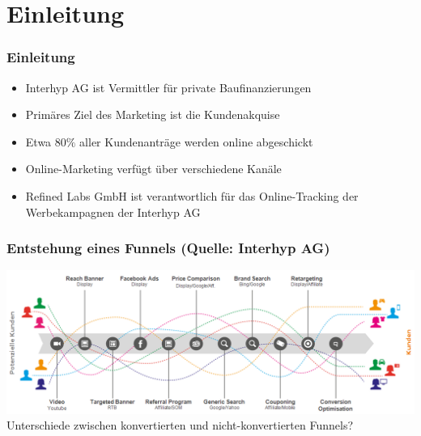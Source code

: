 \section{Einleitung} 

\begin{frame}\frametitle{Einleitung} 
	\begin{itemize}
		\item Interhyp AG ist Vermittler für private Baufinanzierungen
		\item Primäres Ziel des Marketing ist die Kundenakquise
		\item Etwa $80 \%$ aller Kundenanträge werden online abgeschickt
		\item Online-Marketing verfügt über verschiedene Kanäle
		\item Refined Labs GmbH ist verantwortlich für das Online-Tracking der Werbekampagnen der Interhyp AG
	\end{itemize}
\end{frame}

\begin{frame}\frametitle{Entstehung eines Funnels (Quelle: Interhyp AG)}
	\includegraphics[scale=0.38]{customerJourney.png}\\
	\centering Unterschiede zwischen konvertierten und nicht-konvertierten Funnels?
\end{frame}